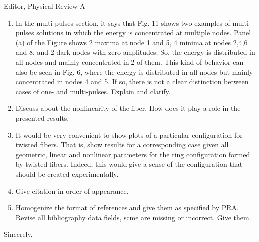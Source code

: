 \documentclass[11pt]{letter}
\begin{document}
\begin{letter}{Editor, Physical Review A}
\begin{enumerate}
\item In the multi-pulses section, it says that Fig. 11 shows two examples of multi-pulses solutions in which the energy is concentrated at multiple nodes. Panel (a) of the Figure shows 2 maxima at node 1 and 5, 4 minima at nodes 2,4,6 and 8, and 2 dark nodes with zero amplitudes. So, the energy is distributed in all nodes and mainly concentrated in 2 of them. This kind of behavior can also be seen in Fig. 6, where the energy is distributed in all nodes but mainly concentrated in nodes 4 and 5. If so, there is not a clear distinction between cases of one- and multi-pulses. Explain and clarify.

\item Discuss about the nonlinearity of the fiber. How does it play a role in the presented results.

\item It would be very convenient to show plots of a particular configuration for twisted fibers. That is, show results for a corresponding case given all geometric, linear and nonlinear parameters for the ring configuration formed by twisted fibers. Indeed, this would give a sense of the configuration that should be created experimentally.

\item Give citation in order of appearance.

\item Homogenize the format of references and give them as specified by PRA. Revise all bibliography data fields, some are missing or incorrect. Give them.

\end{enumerate}

\closing{Sincerely,}

\end{letter}
\end{document}
